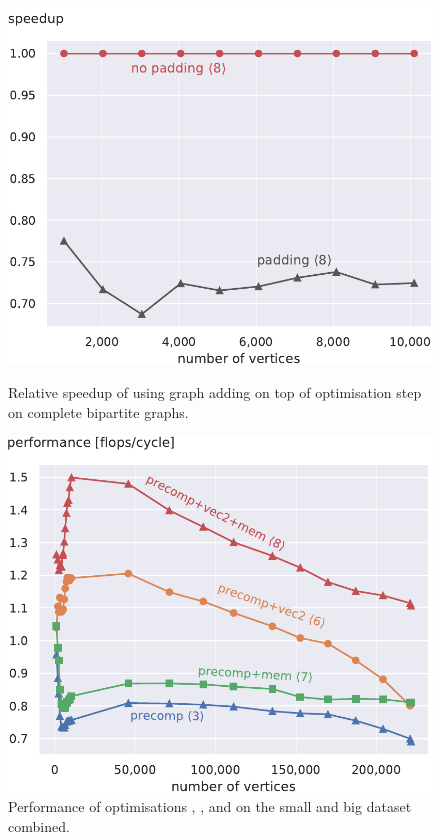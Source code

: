 \documentclass[letterpaper]{article}
\begin{document}
\begin{figure}[!t]
\begin{minipage}[t]{\oldlinewidth}\centering
	\includegraphics[width=\linewidth]{img/speedup[8]padding_bipartite.pdf}
	\caption{Relative speedup of using graph adding on top of optimisation step  on complete bipartite graphs. \label{speedupGraphPaddingBipartite}}
\end{minipage}%
\hfil
\begin{minipage}[t]{\oldlinewidth}\centering
	\includegraphics[width=\linewidth]{img/performance[3][6][7][8]_both.pdf}
	\caption{Performance of optimisations , ,  and  on the small and big dataset combined. \label{cpctVectPerformanceBoth}}
\end{minipage}%
\end{figure}
\end{document}

